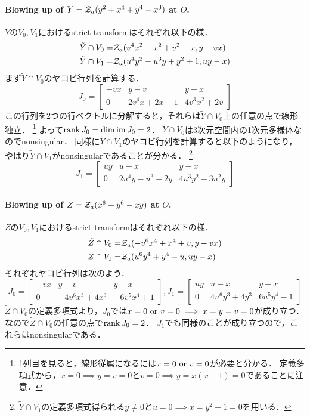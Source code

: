 \documentclass[a4paper]{jsarticle}
\begin{document}
    \paragraph{Blowing up of $Y=\mathcal{Z}_a(y^2+x^4+y^4-x^3)$ at $O$.}
    $Y$の$V_0, V_1$におけるstrict transformはそれぞれ以下の様．
    \begin{align*}
        \tilde{Y} \cap V_0=& \mathcal{Z}_a(v^4 x^2+x^2+v^2-x, y-vx) \\
        \tilde{Y} \cap V_1=& \mathcal{Z}_a(u^4 y^2-u^3y+y^2+1, uy-x)
    \end{align*}
    まず$\tilde{Y} \cap V_0$のヤコビ行列を計算する．
    \[
        J_0=
        \begin{bmatrix}
            -vx & y-v & y-x \\
            0 & 2v^4x+2x-1 & 4v^3x^2+2v
        \end{bmatrix}
    \]
    この行列を2つの行ベクトルに分解すると，それらは$\tilde{Y} \cap V_0$上の任意の点で線形独立．
    \footnote{1列目を見ると，線形従属になるには$x=0 \text{ or } v=0$が必要と分かる．
    定義多項式から，$x=0 \implies y=v=0$と$v=0 \implies y=x(x-1)=0$であることに注意．}
    よって$\operatorname{rank} J_0=\dim \operatorname{im} J_0=2$．
    $\tilde{Y} \cap V_0$は3次元空間内の1次元多様体なのでnonsingular．
    同様に$\tilde{Y} \cap V_1$のヤコビ行列を計算すると以下のようになり，
    やはり$\tilde{Y} \cap V_1$がnonsingularであることが分かる．
    \footnote{$\tilde{Y} \cap V_1$の定義多項式得られる$y \neq 0$と$u=0 \implies x=y^2-1=0$を用いる．}
    \[
        J_1=
        \begin{bmatrix}
            uy & u-x & y-x \\
            0 & 2u^4 y-u^3+2y & 4u^3 y^2-3u^2y
        \end{bmatrix}
    \]

    \paragraph{Blowing up of $Z=\mathcal{Z}_a(x^6+y^6-xy)$ at $O$.}
    $Z$の$V_0, V_1$におけるstrict transformはそれぞれ以下の様．
    \begin{align*}
        \tilde{Z} \cap V_0=& \mathcal{Z}_a(-v^6 x^4+x^4+v, y-vx) \\
        \tilde{Z} \cap V_1=& \mathcal{Z}_a(u^6 y^4+y^4-u, uy-x)
    \end{align*}
    それぞれヤコビ行列は次のよう．
    \[
        J_0=
        \begin{bmatrix}
            -vx & y-v & y-x \\
            0 & -4v^6x^3+4x^3 & -6v^5x^4+1
        \end{bmatrix},
        J_1=
        \begin{bmatrix}
            uy & u-x & y-x \\
            0 & 4u^6y^3+4y^3 & 6u^5 y^4-1
        \end{bmatrix}
    \]
    $\tilde{Z} \cap V_0$の定義多項式より，$J_0$では$x=0 \text{ or } v=0 \implies x=y=v=0$が成り立つ．
    なので$\tilde{Z} \cap V_0$の任意の点で$\operatorname{rank} J_0=2$．
    $J_1$でも同様のことが成り立つので，これらはnonsingularである．
\end{document}
